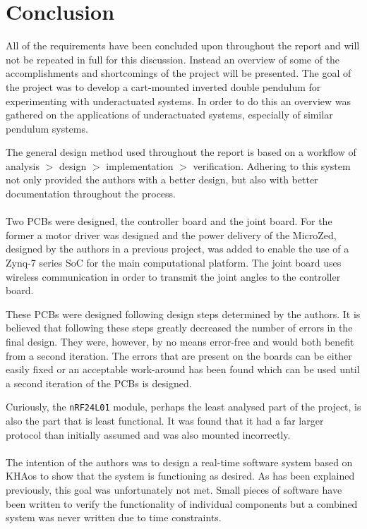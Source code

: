 \section{Conclusion} %
\label{sub:conclusion}
All of the requirements have been concluded upon throughout the report and  will not be repeated in full for this discussion.
Instead an overview of some of the accomplishments and shortcomings of the project will be presented.
The goal of the project was to develop a cart-mounted inverted double pendulum for experimenting with underactuated systems.
In order to do this an overview was gathered on the applications of underactuated systems, especially of similar pendulum systems.

The general design method used throughout the report is based on a workflow of analysis $>$ design $>$ implementation $>$ verification.
Adhering to this system not only provided the authors with a better design, but also with better documentation throughout the process.
\\~\\
Two PCBs were designed, the controller board and the joint board.
For the former a motor driver was designed and the power delivery of the MicroZed, designed by the authors in a previous project, was added to enable the use of a Zynq-7 series SoC for the main computational platform.
The joint board uses wireless communication in order to transmit the joint angles to the controller board.

These PCBs were designed following design steps determined by the authors.
It is believed that following these steps greatly decreased the number of errors in the final design.
They were, however, by no means error-free and would both benefit from a second iteration.
The errors that are present on the boards can be either easily fixed or an acceptable work-around has been found which can be used until a second iteration of the PCBs is designed.

Curiously, the \texttt{nRF24L01} module, perhaps the least analysed part of the project, is also the part that is least functional.
It was found that it had a far larger protocol than initially assumed and was also mounted incorrectly.
\\~\\
The intention of the authors was to design a real-time software system based on KHAos to show that the system is functioning as desired.
As has been explained previously, this goal was unfortunately not met.
Small pieces of software have been written to verify the functionality of individual components but a combined system was never written due to time constraints.

